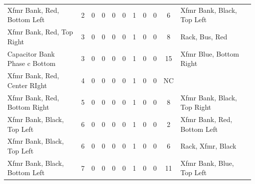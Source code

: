 \begin{table}[!htp]
{\begin{tabular}{lcccccccccll}
			Xfmr Bank, Red, Bottom Left                         & 2                       & 0                                           & 0                                          & 0           & 0           & 1            & 0                & 0 & 6                            & Xfmr Bank, Black, Top Left       &                \\
			Xfmr Bank, Red, Top Right                           & 3                       & 0                                           & 0                                          & 0           & 0           & 1            & 0                & 0 & 8                            & Rack, Bus, Red                   &                \\
			Capacitor Bank Phase c Bottom                       & 3                       & 0                                           & 0                                          & 0           & 0           & 1            & 0                & 0 & 15                           & Xfmr Blue, Bottom Right          &                \\
			Xfmr Bank, Red, Center RIght                        & 4                       & 0                                           & 0                                          & 0           & 0           & 1            & 0                & 0 & NC                           &                                  &                \\
			Xfmr Bank, Red, Bottom Right                        & 5                       & 0                                           & 0                                          & 0           & 0           & 1            & 0                & 0 & 8                            & Xfmr Bank, Black, Top Right      &                \\
			Xfmr Bank, Black, Top Left                          & 6                       & 0                                           & 0                                          & 0           & 0           & 1            & 0                & 0 & 2                            & Xfmr Bank, Red, Bottom Left      &                \\
			Xfmr Bank, Black, Top Left                          & 6                       & 0                                           & 0                                          & 0           & 0           & 1            & 0                & 0 & 6                            & Rack, Xfmr, Black                &                \\
			Xfmr Bank, Black, Bottom Left                       & 7                       & 0                                           & 0                                          & 0           & 0           & 1            & 0                & 0 & 11                           & Xfmr Bank, Blue, Top Left        &                \\

\end{tabular}}
\end{table}
